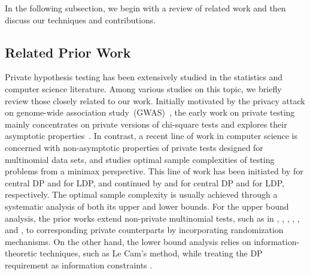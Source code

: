 \documentclass[twoside,11pt]{article}
\begin{document}
In the following subsection, we begin with a review of related work and then discuss our techniques and contributions. 

\subsection{Related Prior Work}\label{section:related_works}
Private hypothesis testing has been extensively studied in the statistics and computer science literature.
Among various studies on this topic, we briefly review those closely related to our work. Initially motivated by the privacy attack on genome-wide association study~(GWAS)~\citep{homer2008resolving}, the early work on private testing mainly concentrates on private versions of chi-square tests and explores their asymptotic properties~\citep{Gaboardi2016DPChisq, Gaboardi2018LDPChisq, Johnson2013PrivacyStudies, Kifer2017DPChisq, Uhler2013PrivacyStudies, Vu2009DifferentialEvaluations, Wang2015DPChisq, Yu2014Chisq}. In contrast, a recent line of work in computer science is concerned with non-asymptotic properties of private tests designed for multinomial data sets, and studies optimal sample complexities of testing problems from a minimax perspective. This line of work has been initiated by \citet{Cai2017DPGofPrivit} for central DP and \citet{Sheffet2018LDP} for LDP, and continued by \citet{Acharya2018dPGofTwosample} and \citet{Aliakbarpour2019PrivatePermutations, Aliakbarpour2018DPgof} for central DP and \citet{Acharya2020Lowerbound, Acharya2021Lowerbound} for LDP, respectively. The optimal sample complexity is usually achieved through a systematic analysis of both its upper and lower bounds. For the upper bound analysis, the prior works extend non-private multinomial tests, such as in \citet{Acharya2015Nonprivate}, \citet{Chan2014Nonprivate}, \citet{Diakonikolas2018Nonprivate}, \citet{Diakonikolas2016Nonprivate}, \citet{Goldreich2000Nonprivate}, and \citet{Valiant2017Nonprivate}, to corresponding private counterparts by incorporating randomization mechanisms. On the other hand, the lower bound analysis relies on information-theoretic techniques, such as Le Cam's method, while treating the DP requirement as information constraints \citep[see e.g.][for detailed discussions]{Acharya2020Lowerbound, Duchi2018MinimaxEstimation}.
\end{document}
